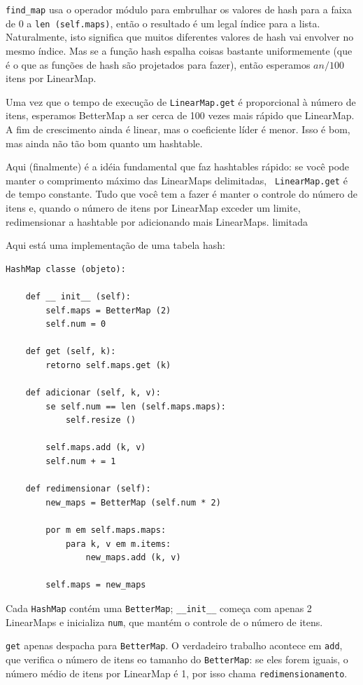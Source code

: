 \documentclass[10pt]{book}
\begin{document}
\begin{exercise}
\begin{v erbatim}
\Verb "find_map" usa o operador módulo para embrulhar os valores de hash
para a faixa de 0 a {\tt len ​​(self.maps)}, então o resultado é um legal
índice para a lista. Naturalmente, isto significa que muitos diferentes
valores de hash vai envolver no mesmo índice. Mas se a função hash
espalha coisas bastante uniformemente (que é o que as funções de hash
são projetados para fazer), então esperamos $ an/100 $ itens por LinearMap.

Uma vez que o tempo de execução de {\tt LinearMap.get} é proporcional à
número de itens, esperamos BetterMap a ser cerca de 100 vezes mais rápido
que LinearMap. A fim de crescimento ainda é linear, mas o
coeficiente líder é menor. Isso é bom, mas ainda não
tão bom quanto um hashtable.

Aqui (finalmente) é a idéia fundamental que faz hashtables rápido: se você
pode manter o comprimento máximo das LinearMaps delimitadas, {\tt
  LinearMap.get} é de tempo constante. Tudo que você tem a fazer é manter o controle
do número de itens e, quando o número de
itens por LinearMap exceder um limite, redimensionar a hashtable por
adicionando mais LinearMaps.
\index{} limitada

Aqui está uma implementação de uma tabela hash:

\begin{verbatim}
HashMap classe (objeto):

    def __ init__ (self):
        self.maps = BetterMap (2)
        self.num = 0

    def get (self, k):
        retorno self.maps.get (k)

    def adicionar (self, k, v):
        se self.num == len (self.maps.maps):
            self.resize ()

        self.maps.add (k, v)
        self.num + = 1

    def redimensionar (self):
        new_maps = BetterMap (self.num * 2)

        por m em self.maps.maps:
            para k, v em m.items:
                new_maps.add (k, v)

        self.maps = new_maps
\end{verbatim}

Cada {\tt HashMap} contém uma {\tt BetterMap}; \verb "__init__" começa
com apenas 2 LinearMaps e inicializa {\tt num}, que mantém o controle de
o número de itens.

{\tt get} apenas despacha para {\tt BetterMap}. O verdadeiro trabalho acontece
em {\tt add}, que verifica o número de itens eo tamanho do
{\tt BetterMap}: se eles forem iguais, o número médio de itens por
LinearMap é 1, por isso chama {\tt redimensionamento}.


\end{v erbatim}
\end{exercise}
\end{document}
